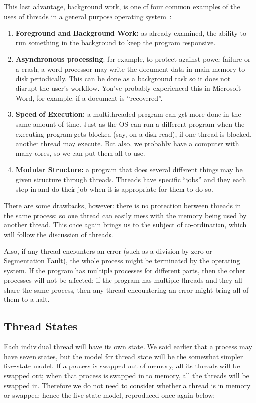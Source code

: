 \documentclass[a4paper]{report}
\begin{document}
This last advantage, background work, is one of four common examples of the uses of threads in a general purpose operating system~\cite{insideOS2}:
\begin{enumerate}
	\item \textbf{Foreground and Background Work:} as already examined, the ability to run something in the background to keep the program responsive.
	\item \textbf{Asynchronous processing}: for example, to protect against power failure or a crash, a word processor may write the document data in main memory to disk periodically. This can be done as a background task so it does not disrupt the user's workflow. You've probably experienced this in Microsoft Word, for example, if a document is ``recovered''.
	\item \textbf{Speed of Execution:} a multithreaded program can get more done in the same amount of time. Just as the OS can run a different program when the executing program gets blocked (say, on a disk read), if one thread is blocked, another thread may execute. But also, we probably have a computer with many cores, so we can put them all to use.
	\item \textbf{Modular Structure:} a program that does several different things may be given structure through threads. Threads have specific ``jobs'' and they each step in and do their job when it is appropriate for them to do so.
\end{enumerate}

There are some drawbacks, however: there is no protection between threads in the same process: so one thread can easily mess with the memory being used by another thread. This once again brings us to the subject of co-ordination, which will follow the discussion of threads.

Also, if any thread encounters an error (such as a division by zero or Segmentation Fault), the whole process might be terminated by the operating system. If the program has multiple processes for different parts, then the other processes will not be affected; if the program has multiple threads and they all share the same process, then any thread encountering an error might bring all of them to a halt.


\subsection*{Thread States}
Each individual thread will have its own state. We said earlier that a process may have seven states, but the model for thread state will be the somewhat simpler five-state model. If a process is swapped out of memory, all its threads will be swapped out; when that process is swapped in to memory, all the threads will be swapped in. Therefore we do not need to consider whether a thread is in memory or swapped; hence the five-state model, reproduced once again below:
\end{document}
